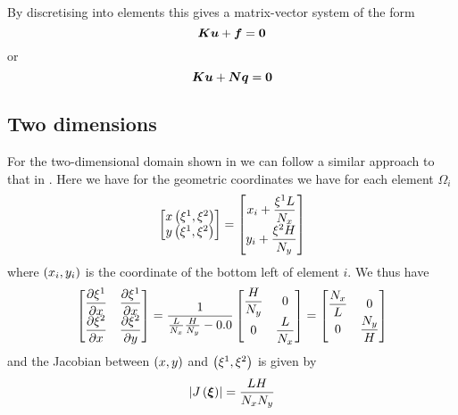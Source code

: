 By discretising into elements this gives a matrix-vector system of the form
\begin{equation}
  \matr{K}\vect{u}+\vect{f}=\vect{0}
\end{equation}
or
\begin{equation}
  \matr{K}\vect{u}+\matr{N}\vectr{q}=\vect{0}
\end{equation}

\subsection{Two dimensions}
\label{subsec:ElementStiffnessMatrixGenLaplace2D}

For the two-dimensional domain shown in
 we can follow a similar approach to that in
. Here we have for the geometric
coordinates we have for each element $\Omega_{i}$
\begin{equation}
  \begin{bmatrix}
     x\left( \xi^{1},\xi^{2} \right)  \\
     y\left( \xi^{1},\xi^{2} \right) 
  \end{bmatrix}= \begin{bmatrix}
    x_{i}+\dfrac{\xi^{1} L}{N_{x}} \\
    y_{i}+\dfrac{\xi^{2} H}{N_{y}}  
  \end{bmatrix}
\end{equation}
where $\left( x_{i},y_{i} \right)$ is the coordinate of the bottom left of element $i$. We thus have 
\begin{equation}
  \begin{bmatrix}
     \dfrac{\partial \xi^{1}}{\partial x}  &  \dfrac{\partial \xi^{1}}{\partial x}  \\
     \dfrac{\partial \xi^{2}}{\partial x}  &  \dfrac{\partial \xi^{2}}{\partial y}          
  \end{bmatrix} = \dfrac{1}{\frac{L}{N_{x}}\frac{H}{N_{y}}-0.0} \begin{bmatrix}
    \dfrac{H}{N_{y}} & 0 \\
    0 & \dfrac{L}{N_{x}}
  \end{bmatrix} = \begin{bmatrix}
    \dfrac{N_{x}}{L} & 0 \\
    0 & \dfrac{N_{y}}{H}
  \end{bmatrix}
\end{equation}
and the Jacobian between $\left( x,y \right)$ and $\left( \xi^{1},\xi^{2} \right)$ is given by
\begin{equation}
  \left|  J\left(  \boldsymbol{\xi}  \right)  \right|=\dfrac{LH}{N_{x}N_{y}}
\end{equation}

